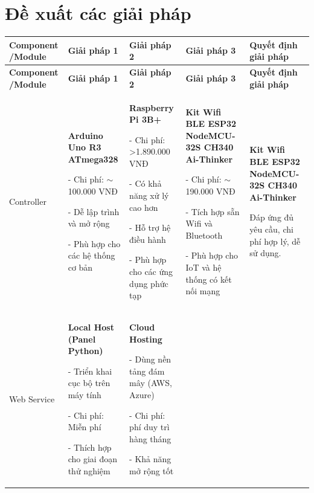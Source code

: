 {\pagebreak
\section{Đề xuất các giải pháp}
{%
\centering
\small
\begin{longtable}{|p{2.3cm}|p{3.2cm}|p{3.2cm}|p{3.2cm}|p{3.5cm}|}
\hline
\textbf{Component /Module} & \textbf{Giải pháp 1} & \textbf{Giải pháp 2} & \textbf{Giải pháp 3} & \textbf{Quyết định giải pháp} \\ \hline
\endfirsthead

\hline
\textbf{Component /Module} & \textbf{Giải pháp 1} & \textbf{Giải pháp 2} & \textbf{Giải pháp 3} & \textbf{Quyết định giải pháp} \\ \hline
\endhead

\hline
Controller 
& \textbf{Arduino Uno R3 ATmega328}


- Chi phí: $\sim$100.000 VNĐ


- Dễ lập trình và mở rộng


- Phù hợp cho các hệ thống cơ bản & \textbf{Raspberry Pi 3B+}


- Chi phí: \textgreater{}1.890.000 VNĐ


- Có khả năng xử lý cao hơn


- Hỗ trợ hệ điều hành


- Phù hợp cho các ứng dụng phức tạp & \textbf{Kit Wifi BLE ESP32 NodeMCU-32S CH340 Ai-Thinker}


- Chi phí: $\sim$190.000 VNĐ


- Tích hợp sẵn Wifi và Bluetooth


- Phù hợp cho IoT và hệ thống có kết nối mạng

& \textbf{Kit Wifi BLE ESP32 NodeMCU-32S CH340 Ai-Thinker}


Đáp ứng đủ yêu cầu, chi phí hợp lý, dễ sử dụng. \\ \hline

Web Service 

& \textbf{Local Host (Panel Python)}


- Triển khai cục bộ trên máy tính


- Chi phí: Miễn phí


- Thích hợp cho giai đoạn thử nghiệm & \textbf{Cloud Hosting}


- Dùng nền tảng đám mây (AWS, Azure)


- Chi phí: phí duy trì hàng tháng


- Khả năng mở rộng tốt



\end{longtable}}}
